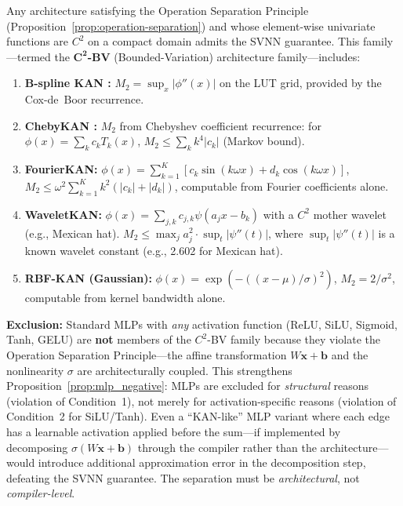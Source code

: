 \vspace{4pt}
\begin{proposition}
\label{prop:c2bv-family}
Any architecture satisfying the Operation Separation Principle
(Proposition~\ref{prop:operation-separation}) and whose element-wise
univariate functions are $C^2$ on a compact domain admits the SVNN
guarantee. This family---termed the $\mathbf{C^2}$\textbf{-BV}
(Bounded-Variation) architecture family---includes:

\begin{enumerate}[label=(\alph*)]
    \item \textbf{B-spline KAN \cite{liu2024kan}:}
    $M_2 = \sup_{x} |\phi''(x)|$ on the LUT grid, provided by
    the Cox-de~Boor recurrence.
    \item \textbf{ChebyKAN \cite{bozorgasl2024chebykan}:}
    $M_2$ from Chebyshev coefficient recurrence: for
    $\phi(x) = \sum_{k} c_k T_k(x)$, $M_2 \leq \sum_{k} k^4 |c_k|$
    (Markov bound).
    \item \textbf{FourierKAN:}
    $\phi(x) = \sum_{k=1}^{K} [c_k \sin(k\omega x) + d_k \cos(k\omega x)]$,
    $M_2 \leq \omega^2 \sum_{k=1}^{K} k^2 (|c_k| + |d_k|)$,
    computable from Fourier coefficients alone.
    \item \textbf{WaveletKAN:}
    $\phi(x) = \sum_{j,k} c_{j,k} \psi(a_j x - b_k)$ with a $C^2$
    mother wavelet (e.g., Mexican hat).
    $M_2 \leq \max_{j} a_j^2 \cdot \sup_{t} |\psi''(t)|$, where
    $\sup_{t} |\psi''(t)|$ is a known wavelet constant
    (e.g., 2.602 for Mexican hat).
    \item \textbf{RBF-KAN (Gaussian):}
    $\phi(x) = \exp(-((x-\mu)/\sigma)^2)$,
    $M_2 = 2/\sigma^2$, computable from kernel bandwidth alone.
\end{enumerate}

\textbf{Exclusion:} Standard MLPs with \textit{any} activation function
(ReLU, SiLU, Sigmoid, Tanh, GELU) are \textbf{not} members of the
$C^2$-BV family because they violate the Operation Separation
Principle---the affine transformation $W\mathbf{x}+\mathbf{b}$ and
the nonlinearity $\sigma$ are architecturally coupled. This
strengthens Proposition~\ref{prop:mlp_negative}: MLPs are excluded
for \textit{structural} reasons (violation of Condition~1), not
merely for activation-specific reasons (violation of Condition~2
for SiLU/Tanh). Even a ``KAN-like'' MLP variant where each edge
has a learnable activation applied before the sum---if implemented
by decomposing $\sigma(W\mathbf{x}+\mathbf{b})$ through the compiler
rather than the architecture---would introduce additional
approximation error in the decomposition step, defeating the SVNN
guarantee. The separation must be \textit{architectural}, not
\textit{compiler-level}.
\end{proposition}

